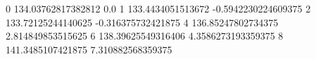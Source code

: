 0 134.03762817382812 0.0
1 133.4434051513672 -0.5942230224609375
2 133.72125244140625 -0.316375732421875
4 136.85247802734375 2.814849853515625
6 138.39625549316406 4.3586273193359375
8 141.3485107421875 7.310882568359375
